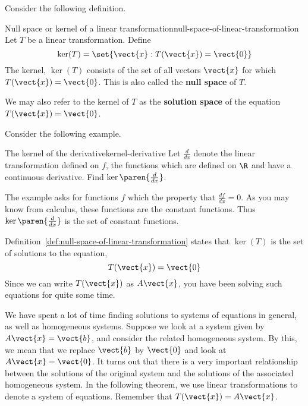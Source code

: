 Consider the following definition.

\begin{definition}{Null space or kernel of a linear transformation}{null-space-of-linear-transformation}
Let $T$ be a linear transformation. Define
\begin{equation*}
\ker (T) = \set{\vect{x}:T (\vect{x})= \vect{0} } 
\end{equation*}
The kernel, $\ker (T) $ consists of the set of all vectors $\vect{x}$ for which
$T (\vect{x}) = \vect{0}$. This is also called the
\textbf{null space} of $T$. 
\end{definition}

We may also refer to the kernel of $T$ as the
\textbf{solution space} of the equation $T (\vect{x}) = \vect{0}$.


Consider the following example.

\begin{example}{The kernel of the derivative}{kernel-derivative}
Let $\frac{d}{dx}$ denote the linear transformation defined on $f$, the functions
which are defined on $\R$ and have a continuous derivative. Find 
$\ker \paren{\frac{d}{dx}}$.
\end{example}

\begin{solution} The example asks for functions $f$ which the property that $\frac{df}{dx}
=0. $ As you may know from calculus, these functions are the constant functions.
Thus $\ker \paren{\frac{d}{dx}}$ is the set of constant functions.
\end{solution} 

Definition~\ref{def:null-space-of-linear-transformation} states that $\ker (T) $ is the set of
solutions to the equation,
\begin{equation*}
T(\vect{x}) = \vect{0}
\end{equation*}
Since we can write $T(\vect{x})$ as $A\vect{x}$, you have been solving such
equations for quite some time.

We have spent a lot of time finding solutions to systems of equations in general, as well as
homogeneous systems. Suppose we look at a system given by $A\vect{x}=\vect{b}$, and consider the 
related homogeneous system. By this, we mean that we replace $\vect{b}$ by $\vect{0}$ and look at $A\vect{x}=\vect{0}$. 
It turns out that there is a very important relationship between the solutions of the original
system and the solutions of the associated homogeneous system. In the following 
theorem, we use linear transformations to denote a system of equations. Remember that
$T(\vect{x}) = A\vect{x}$.

